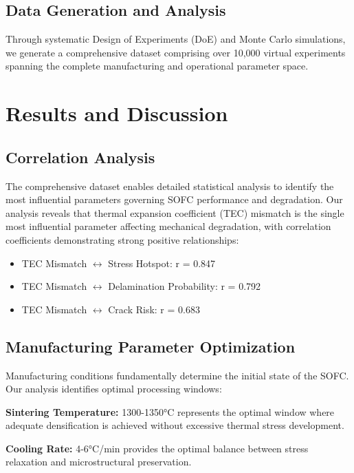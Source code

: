 \documentclass[11pt,a4paper]{article}
\begin{document}
\subsection{Data Generation and Analysis}

Through systematic Design of Experiments (DoE) and Monte Carlo simulations, we generate a comprehensive dataset comprising over 10,000 virtual experiments spanning the complete manufacturing and operational parameter space.

\section{Results and Discussion}

\subsection{Correlation Analysis}

The comprehensive dataset enables detailed statistical analysis to identify the most influential parameters governing SOFC performance and degradation. Our analysis reveals that thermal expansion coefficient (TEC) mismatch is the single most influential parameter affecting mechanical degradation, with correlation coefficients demonstrating strong positive relationships:

\begin{itemize}
\item TEC Mismatch $\leftrightarrow$ Stress Hotspot: r = 0.847
\item TEC Mismatch $\leftrightarrow$ Delamination Probability: r = 0.792
\item TEC Mismatch $\leftrightarrow$ Crack Risk: r = 0.683
\end{itemize}

\subsection{Manufacturing Parameter Optimization}

Manufacturing conditions fundamentally determine the initial state of the SOFC. Our analysis identifies optimal processing windows:

\textbf{Sintering Temperature:} 1300-1350°C represents the optimal window where adequate densification is achieved without excessive thermal stress development.

\textbf{Cooling Rate:} 4-6°C/min provides the optimal balance between stress relaxation and microstructural preservation.
\end{document}
